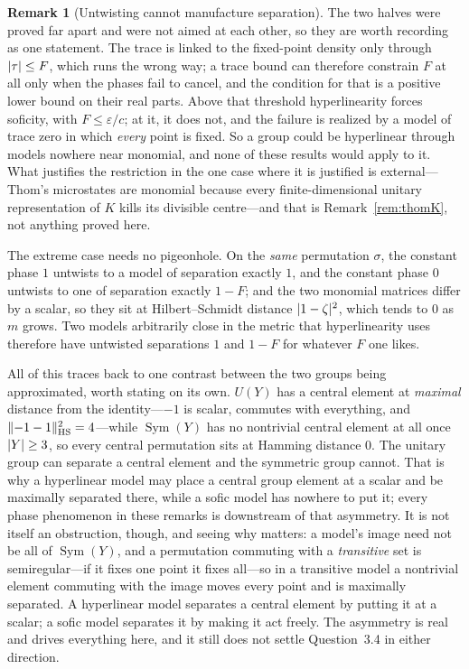 \documentclass[11pt]{amsart}
\theoremstyle{definition}
\newtheorem{remark}[theorem]{Remark}
\theoremstyle{plain}
\newcommand{\Sym}{\operatorname{Sym}}
\newcommand{\eps}{\varepsilon}
\DeclarePairedDelimiter{\abs}{\lvert}{\rvert}
\DeclarePairedDelimiter{\norm}{\lVert}{\rVert}
\begin{document}
\begin{remark}[Untwisting cannot manufacture separation]
The two halves were proved far apart and were not aimed at each other, so they are worth recording as one statement.  The trace is linked to the fixed-point density only through \(\abs\tau\leq F\), which runs the wrong way; a trace bound can therefore constrain \(F\) at all only when the phases fail to cancel, and the condition for that is a positive lower bound on their real parts.  Above that threshold hyperlinearity forces soficity, with \(F\leq\eps/c\); at it, it does not, and the failure is realized by a model of trace zero in which \emph{every} point is fixed.  So a group could be hyperlinear through models nowhere near monomial, and none of these results would apply to it.  What justifies the restriction in the one case where it is justified is external---Thom's microstates are monomial because every finite-dimensional unitary representation of \(K\) kills its divisible centre---and that is Remark~\ref{rem:thomK}, not anything proved here.

The extreme case needs no pigeonhole.  On the \emph{same} permutation \(\sigma\), the constant phase \(1\) untwists to a model of separation exactly \(1\), and the constant phase \(0\) untwists to one of separation exactly \(1-F\); and the two monomial matrices differ by a scalar, so they sit at Hilbert--Schmidt distance \(\abs{1-\zeta}^2\), which tends to \(0\) as \(m\) grows.  Two models arbitrarily close in the metric that hyperlinearity uses therefore have untwisted separations \(1\) and \(1-F\) for whatever \(F\) one likes.

All of this traces back to one contrast between the two groups being approximated, worth stating on its own.  \(U(Y)\) has a central element at \emph{maximal} distance from the identity---\(-1\) is scalar, commutes with everything, and \(\norm{-1-1}^2_{\mathrm{HS}}=4\)---while \(\Sym(Y)\) has no nontrivial central element at all once \(\abs Y\geq3\), so every central permutation sits at Hamming distance \(0\).  The unitary group can separate a central element and the symmetric group cannot.  That is why a hyperlinear model may place a central group element at a scalar and be maximally separated there, while a sofic model has nowhere to put it; every phase phenomenon in these remarks is downstream of that asymmetry.  It is not itself an obstruction, though, and seeing why matters: a model's image need not be all of \(\Sym(Y)\), and a permutation commuting with a \emph{transitive} set is semiregular---if it fixes one point it fixes all---so in a transitive model a nontrivial element commuting with the image moves every point and is maximally separated.  A hyperlinear model separates a central element by putting it at a scalar; a sofic model separates it by making it act freely.  The asymmetry is real and drives everything here, and it still does not settle Question~3.4 in either direction.


\end{remark}
\end{document}
